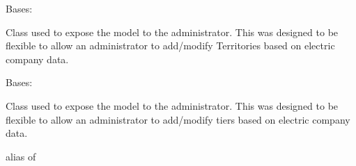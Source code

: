 \documentclass[letterpaper,10pt,english]{sphinxmanual}
\begin{document}
\begin{fulllineitems}
\label{modules/webapp:webapp.admin.TerritoryAdmin}
Bases: 

Class used to expose the  model to the administrator. This was designed to be flexible to allow an administrator to add/modify Territories based on electric company data.

\begin{fulllineitems}
\label{modules/webapp:webapp.admin.TerritoryAdmin.list_display}
\end{fulllineitems}


\begin{fulllineitems}
\label{modules/webapp:webapp.admin.TerritoryAdmin.media}
\end{fulllineitems}


\end{fulllineitems}


\begin{fulllineitems}
\label{modules/webapp:webapp.admin.TierInline}
Bases: 

Class used to expose the {\hyperref[modules/webapp:webapp.models.Tier]{\emph{}}} model to the administrator. This was designed to be flexible to allow an administrator to add/modify tiers based on electric company data.

\begin{fulllineitems}
\label{modules/webapp:webapp.admin.TierInline.media}
\end{fulllineitems}


\begin{fulllineitems}
\label{modules/webapp:webapp.admin.TierInline.model}
alias of 

\end{fulllineitems}


\end{fulllineitems}
\end{document}
